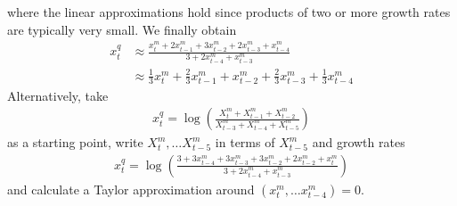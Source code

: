 where the linear approximations hold since products of two or more growth rates are typically very small. We finally obtain
\begin{align}
x_t^q &\approx \frac{x_t^m + 2x_{t-1}^m + 3x_{t-2}^m + 2x_{t-3}^m + x_{t-4}^m}{3 + 2 x_{t-4}^m + x_{t-3}^m} \\
&\approx \frac{1}{3} x_t^m + \frac{2}{3} x_{t-1}^m + x_{t-2}^m + \frac{2}{3} x_{t-3}^m + \frac{1}{3} x_{t-4}^m
\end{align}
Alternatively, take 
\begin{align}
x^q_t = \log\left(\frac{X^m_t + X^m_{t-1} + X^m_{t-2}}{X^m_{t-3} + X^m_{t-4} + X^m_{t-5}}\right)
\end{align}
as a starting point, write $X^m_t, \dots X^m_{t-5}$ in terms of $X^m_{t-5}$ and growth rates 
\begin{align}
x^q_t = \log\left(\frac{3 + 3x^m_{t-4} + 3x^m_{t-3} + 3x^m_{t-2} + 2x^m_{t-2} +x^m_t}{3 + 2x^m_{t-4} + x^m_{t-3}}\right)
\end{align}
and calculate a Taylor approximation around $(x^m_t, \dots x^m_{t-4}) = 0$.\\

